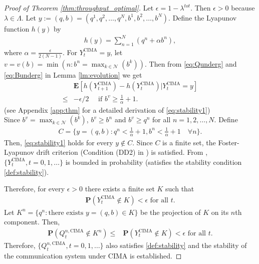 \documentclass[onecolumn,draftcls]{IEEEtran}
\newcommand{\g}{\text{CIMA}}
\begin{document}
\begin{proof}[Proof of Theorem \ref{thm:throughput_optimal}]
Let $\epsilon = 1 - \lambda^{tot}$. Then $\epsilon>0$ because $\lambda \in \Lambda$.
Let $y:=(q,b)=(q^1,q^2,\dots,q^N,b^1,b^2,\dots,b^N)$.
Define the Lyapunov function $h(y)$ by
\begin{align}
h(y) = \sum_{n=1}^N (q^n + \alpha b^n),
\label{eq:lyafun}
\end{align}
where $\alpha = \frac{\epsilon}{2(N-1)}$.
For $Y^{\g}_t = y$,
let $v = v(b)=\min(n: b^n=\max_{k\in \mathcal{N}}(b^{k}))$.
Then from \eqref{eq:Qunderg} and \eqref{eq:Bunderg} in Lemma \ref{lm:evolution} we get
\begin{align}
 & \mathbf{E}\left[h(Y^{\g}_{t+1}) - h(Y^{\g}_t) | Y^{\g}_t=y\right] \nonumber\\
\leq & -\epsilon/2 \quad \text{   if } b^v \geq \frac{1}{\alpha}+1.
\label{eq:stability1}
\end{align}
(see Appendix \ref{app:thm} for a detailed derivation of \eqref{eq:stability1})
\\
Since $b^v=\max_{k \in \mathcal{N}}(b^{k})$, $b^v \geq b^n$ and $b^v\geq q^n$ for all $n=1,2,\dots,N$.
Define 
\begin{align*}
C = \{y=(q,b): q^n<\frac{1}{\alpha}+1, b^n<\frac{1}{\alpha}+1 \quad\forall n\}.
\end{align*}
Then, \eqref{eq:stability1} holds for every $y \notin C$.
Since $C$ is a finite set, the Foster-Lyapunov drift criterion (Condition (DD2) in \cite{meyn1992stability}) is satisfied.
From \cite[Theorem 4.5]{meyn1992stability}, $\{Y^{\g}_t, t=0,1,\dots\}$ is bounded in probability (satisfies the stability condition \eqref{def:stability}).



Therefore, for every $\epsilon>0$ there exists a finite set $K$ such that
\begin{align}
\mathbf{P}(Y^{\g}_t \notin K ) < \epsilon \text{ for all }t.
\label{eq:bddinprob}
\end{align}
Let $K^n = \{q^n: \text{there exists }y = (q,b) \in K\}$ be the projection of $K$ on its $n$th component.
Then,
\begin{align}
\mathbf{P}(Q^{n,\g}_t \notin K^n )
\leq 
& \mathbf{P}(Y^{\g}_t \notin K ) < \epsilon \text{ for all }t.
\label{eq:bddinprob2}
\end{align}
Therefore,
$\{Q^{n,\g}_t,t=0,1,\dots\}$
also satisfies \eqref{def:stability} and the stability of the communication system under $\g$ is established.



\end{proof}
\end{document}
